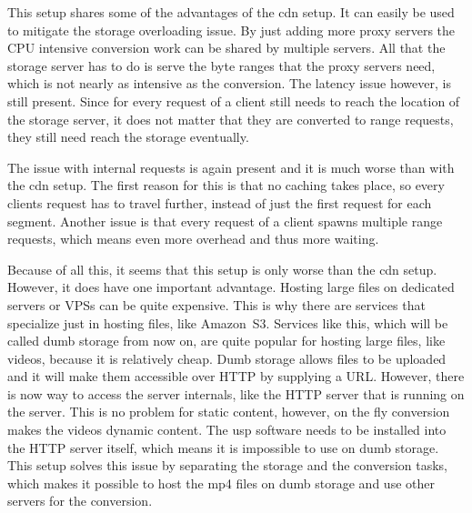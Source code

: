 \documentclass[twoside,openright]{uva-bachelor-thesis}
\begin{document}
This setup shares some of the advantages of the \gls{cdn} setup. It can easily
be used to mitigate the storage overloading issue. By just adding more proxy
servers the CPU intensive conversion work can be shared by multiple servers. All
that the storage server has to do is serve the byte ranges that the proxy
servers need, which is not nearly as intensive as the conversion. The latency
issue however, is still present. Since for every request of a client still needs
to reach the location of the storage server, it does not matter that they are
converted to range requests, they still need reach the storage eventually.

The issue with internal requests is again present and it is much worse than with
the \gls{cdn} setup. The first reason for this is that no caching takes place,
so every clients request has to travel further, instead of just the first
request for each segment. Another issue is that every request of a client spawns
multiple range requests, which means even more overhead and thus more waiting.

Because of all this, it seems that this setup is only worse than the \gls{cdn}
setup. However, it does have one important advantage. Hosting large files on
dedicated servers or VPSs can be quite expensive. This is why there are
services that specialize just in hosting files, like Amazon~S3. Services like
this, which will be called dumb storage from now on, are quite popular for
hosting large files, like videos, because it is relatively cheap. Dumb storage
allows files to be uploaded and it will make them accessible over HTTP by
supplying a URL\@.  However, there is now way to access the server internals,
like the HTTP server that is running on the server. This is no problem for
static content, however, on the fly conversion makes the videos dynamic content.
The \gls{usp} software needs to be installed into the HTTP server itself, which
means it is impossible to use on dumb storage. This setup solves this issue by
separating the storage and the conversion tasks, which makes it possible to host
the mp4 files on dumb storage and use other servers for the conversion.
\end{document}
